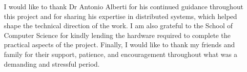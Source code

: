 I would like to thank Dr Antonio Alberti for his continued guidance throughout this project and for sharing his expertise in distributed systems, which helped shape the technical direction of the work. I am also grateful to the School of Computer Science for kindly lending the hardware required to complete the practical aspects of the project. Finally, I would like to thank my friends and family for their support, patience, and encouragement throughout what was a demanding and stressful period.



